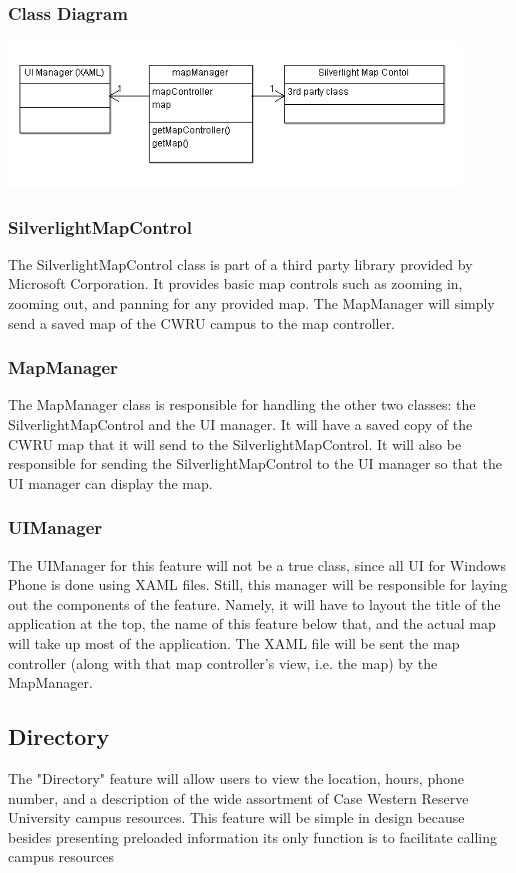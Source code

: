 \documentclass[pdftex,12pt,letter]{article}
\begin{document}
\subsubsection{Class Diagram}
\includegraphics[width=120mm]{MapCD.png}
\subsubsection{SilverlightMapControl}
The SilverlightMapControl class is part of a third party library provided by Microsoft Corporation. It provides basic map controls such as zooming in, zooming out, and panning for any provided map. The MapManager will simply send a saved map of the CWRU campus to the map controller.
\subsubsection{MapManager}
The MapManager class is responsible for handling the other two classes: the SilverlightMapControl and the UI manager. It will have a saved copy of the CWRU map that it will send to the SilverlightMapControl. It will also be responsible for sending the SilverlightMapControl to the UI manager so that the UI manager can display the map.
\subsubsection{UIManager}
The UIManager for this feature will not be a true class, since all UI for Windows Phone is done using XAML files. Still, this manager will be responsible for laying out the components of the feature. Namely, it will have to layout the title of the application at the top, the name of this feature below that, and the actual map will take up most of the application. The XAML file will be sent the map controller (along with that map controller's view, i.e. the map)  by the MapManager.
\subsection{Directory}
The "Directory" feature will allow users to view the location, hours, phone number, and a description of the wide assortment of Case Western Reserve University campus resources. This feature will be simple in design because besides presenting preloaded information its only function is to facilitate calling campus resources 
\end{document}
